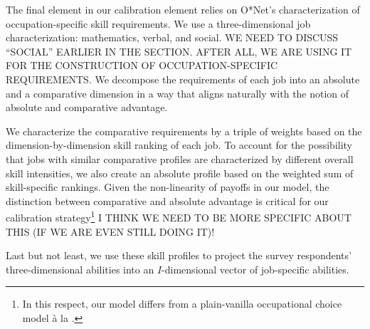 \documentclass[onehalfspacing,11pt]{article}
\begin{document}
The final element in our calibration element relies on O*Net's characterization of occupation-specific skill requirements. We use a three-dimensional job characterization: mathematics, verbal, and social. WE NEED TO DISCUSS ``SOCIAL'' EARLIER IN THE SECTION. AFTER ALL, WE ARE USING IT FOR THE CONSTRUCTION OF OCCUPATION-SPECIFIC REQUIREMENTS. We decompose the requirements of each job into an absolute and a comparative dimension in a way that aligns naturally with the notion of absolute and comparative advantage.

We characterize the comparative requirements by a triple of weights based on the dimension-by-dimension skill ranking of each job. To account for the possibility that jobs with similar comparative profiles are characterized by different overall skill intensities, we also create an absolute profile based on the weighted sum of skill-specific rankings. Given the non-linearity of payoffs in our model, the distinction between comparative and absolute advantage is critical for our calibration strategy\footnote{In this respect, our model differs from a plain-vanilla occupational choice model \`a la \cite{Roy:1951}.} I THINK WE NEED TO BE MORE SPECIFIC ABOUT THIS (IF WE ARE EVEN STILL DOING IT)!

Last but not least, we use these skill profiles to project the survey respondents' three-dimensional abilities into an $I$-dimensional vector of job-specific abilities.


\end{document}
